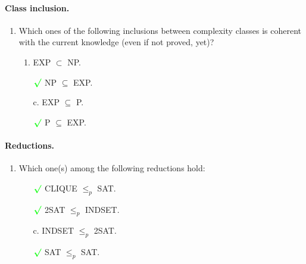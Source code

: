 \documentclass{article}
\begin{document}
			\paragraph{Class inclusion.}
			\begin{enumerate}[label=\textbf{\arabic*.}, leftmargin=*]
				\item Which ones of the following inclusions between complexity classes is coherent with the current knowledge (even if not proved, yet)?
				\begin{enumerate}[label=\alph*.]
					\item EXP $\subset$ NP.
					\item[$\color{green}\boldsymbol{\surd}$] NP $\subseteq$ EXP.
					\item[c.] EXP $\subseteq$ P.
					\item[$\color{green}\boldsymbol{\surd}$] P $\subseteq$ EXP.
				\end{enumerate}
			\end{enumerate}
			\paragraph{Reductions.}
			\begin{enumerate}[label=\textbf{\arabic*.}, leftmargin=*]
				\item Which one(s) among the following reductions hold:
				\begin{enumerate}[label=\alph*.]
					\item[$\color{green}\boldsymbol{\surd}$] CLIQUE $\leq_p$ SAT.
					\item[$\color{green}\boldsymbol{\surd}$] 2SAT $\leq_p$ INDSET.
					\item[c.] INDSET $\leq_p$ 2SAT.
					\item[$\color{green}\boldsymbol{\surd}$] SAT $\leq_p$ SAT.
				\end{enumerate}
			\end{enumerate}
\end{document}
